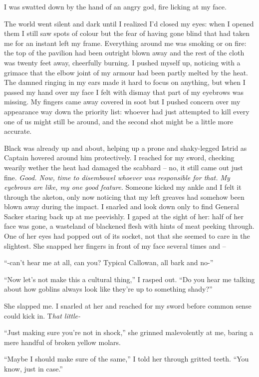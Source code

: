 \documentclass[12pt, openany]{book}
\begin{document}
I was swatted down by the hand of an angry god, fire licking at my face.

The world went silent and dark until I realized I’d closed my eyes: when I opened them I still saw spots of colour but the fear of having gone blind that had taken me for an instant left my frame. Everything around me was smoking or on fire: the top of the pavilion had been outright blown away and the rest of the cloth was twenty feet away, cheerfully burning. I pushed myself up, noticing with a grimace that the elbow joint of my armour had been partly melted by the heat. The damned ringing in my ears made it hard to focus on anything, but when I passed my hand over my face I felt with dismay that part of my eyebrows was missing. My fingers came away covered in soot but I pushed concern over my appearance way down the priority list: whoever had just attempted to kill every one of us might still be around, and the second shot might be a little more accurate.

Black was already up and about, helping up a prone and shaky-legged Istrid as Captain hovered around him protectively. I reached for my sword, checking wearily wether the heat had damaged the scabbard – no, it still came out just fine. \textit{Good. Now, time to disembowel whoever was responsible for that. My eyebrows are like, my one good feature.} Someone kicked my ankle and I felt it through the aketon, only now noticing that my left greaves had somehow been blown away during the impact. I snarled and look down only to find General Sacker staring back up at me peevishly. I gaped at the sight of her: half of her face was gone, a wasteland of blackened flesh with hints of meat peeking through. One of her eyes had popped out of its socket, not that she seemed to care in the slightest. She snapped her fingers in front of my face several times and –

“-can’t hear me at all, can you? Typical Callowan, all bark and no-”

“Now let’s not make this a cultural thing,” I rasped out. “Do you hear me talking about how goblins always look like they’re up to something shady?”

She slapped me. I snarled at her and reached for my sword before common sense could kick in. T\textit{hat little-}

“Just making sure you’re not in shock,” she grinned malevolently at me, baring a mere handful of broken yellow molars.

“Maybe I should make sure of the same,” I told her through gritted teeth. “You know, just in case.”
\end{document}
